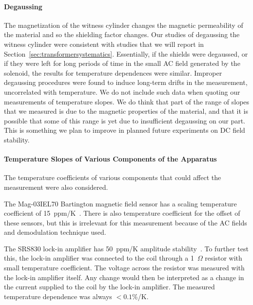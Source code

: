 \paragraph{Degaussing}
The magnetization of the witness cylinder changes the magnetic
permeability of the material and so the shielding factor changes.  Our
studies of degaussing the witness cylinder were consistent with
studies that we will report in
Section~\ref{sec:transformersystematics}.  Essentially, if the shields
were degaussed, or if they were left for long periods of time in the
small AC field generated by the solenoid, the results for temperature
dependences were similar.  Improper degaussing procedures were found
to induce long-term drifts in the measurement, uncorrelated with
temperature.  We do not include such data when quoting our
measurements of temperature slopes.  We do think that part of the
range of slopes that we measured is due to the magnetic properties of
the material, and that it is possible that some of this range is yet
due to insufficient degaussing on our part.  This is something we plan
to improve in planned future experiments on DC field stability.




\paragraph{Temperature Slopes of Various Components of the Apparatus}

The temperature coefficients of various components that could affect
the measurement were also considered.

The Mag-03IEL70 Bartington magnetic field sensor has a scaling
temperature coefficient of 15~ppm/K~\cite{bartman}.  There is also
temperature coefficient for the offset of these sensors, but this is
irrelevant for this measurement because of the AC fields and
demodulation technique used.

The SRS830 lock-in amplifier has 50~ppm/K amplitude
stability~\cite{lockin}.
To further test this, the lock-in amplifier was connected to the coil
through a 1~$\Omega$ resistor with small temperature coefficient.  The
voltage across the resistor was measured with the lock-in amplifier
itself.  Any change would then be interpreted as a change in the
current supplied to the coil by the lock-in amplifier. The measured
temperature dependence was always $<0.1$\%/K.


